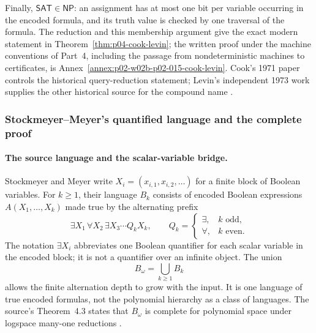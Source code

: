 Finally, \(\mathsf{SAT}\in\mathsf{NP}\): an assignment has at most one bit per
variable occurring in the encoded formula, and its truth value is checked by
one traversal of the formula.  The reduction and this membership argument
give the exact modern statement in Theorem~\ref{thm:p04-cook-levin}; the
written proof under the machine conventions of Part~4, including the passage
from nondeterministic machines to certificates, is
Annex~\ref{annex:p02-w02b-p02-015-cook-levin}.
Cook's 1971 paper controls the historical query-reduction statement; Levin's
independent 1973 work supplies the other historical source for the compound
name \cite{Cook1971,Levin1973,AroraBarak2009}.

\subsubsection{Stockmeyer--Meyer's quantified language and the complete proof}

\paragraph{The source language and the scalar-variable bridge.}
Stockmeyer and Meyer write
\(X_i=(x_{i,1},x_{i,2},\ldots)\) for a finite block of Boolean variables.  For
\(k\geq1\), their language \(B_k\) consists of encoded Boolean expressions
\(A(X_1,\ldots,X_k)\) made true by the alternating prefix
\[
 \exists X_1\,\forall X_2\,\exists X_3\cdots Q_kX_k,
 \qquad
 Q_k=
 \begin{cases}
  \exists,&k\text{ odd},\\
  \forall,&k\text{ even}.
 \end{cases}
\]
The notation \(\exists X_i\) abbreviates one Boolean quantifier for each scalar
variable in the encoded block; it is not a quantifier over an infinite object.
The union
\[
 B_\omega=\bigcup_{k\geq1}B_k
\]
allows the finite alternation depth to grow with the input.  It is one language
of true encoded formulas, not the polynomial hierarchy as a class of languages.
The source's Theorem~4.3 states that \(B_\omega\) is complete for polynomial
space under logspace many-one reductions
\cite[thm.~4.3]{StockmeyerMeyer1973}.

